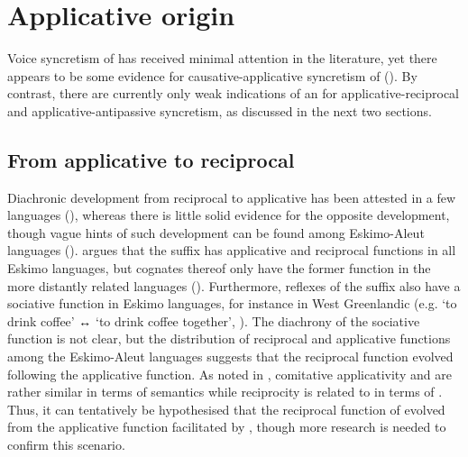 \section{Applicative origin} \label{diachrony:applicative}
Voice syncretism of  has received minimal attention in the literature, yet there appears to be some evidence for causative-applicative syncretism of  (). By contrast, there are currently only weak indications of an  for applicative-reciprocal and applicative-antipassive syncretism, as discussed in the next two sections.

\subsection{From applicative to reciprocal} \label{diachrony:appl2recp}
Diachronic development from reciprocal to applicative has been attested in a few languages (), whereas there is little solid evidence for the opposite development, though vague hints of such development can be found among Eskimo-Aleut languages (). \cite[841]{fortescue:2007} argues that the  suffix  has applicative and reciprocal functions in all Eskimo languages, but cognates thereof only have the former function in the more distantly related  languages (). Furthermore, reflexes of the suffix also have a sociative function in Eskimo languages, for instance in West Greenlandic (e.g.  ‘to drink coffee’ ↔  ‘to drink coffee together’, \citealt[827]{fortescue:2007}). The diachrony of the sociative function is not clear, but the distribution of reciprocal and applicative functions among the Eskimo-Aleut languages suggests that the reciprocal function evolved following the applicative function. As noted in , comitative applicativity and  are rather similar in terms of semantics while reciprocity is related to  in terms of . Thus, it can tentatively be hypothesised that the reciprocal function of   evolved from the applicative function facilitated by , though more research is needed to confirm this scenario.

